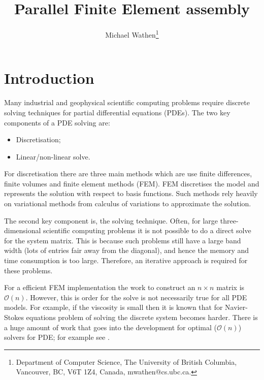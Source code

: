 \documentclass[11pt]{article}
\title{Parallel Finite Element assembly}
\author{
 Michael Wathen\thanks{Department of Computer Science,
The University of British Columbia, Vancouver, BC, V6T 1Z4, Canada,
 mwathen@cs.ubc.ca.}
}
\begin{document}
\maketitle





\section{Introduction}

Many industrial and geophysical scientific computing problems require discrete solving techniques for partial differential equations (PDEs). The two key components of a PDE solving are:
\begin{itemize}
    \item Discretisation;
    \item Linear/non-linear solve.
\end{itemize}
For discretisation there are three main methods which are use finite differences, finite volumes and finite element methods (FEM). FEM discretises the model and represents the solution with respect to basis functions. Such methods rely heavily on variational methods from calculus of variations to approximate the solution.

The second key component is, the solving technique. Often, for large three-dimensional scientific computing problems it is not possible to do a direct solve for the system matrix. This is because such problems still have a large band width (lots of entries fair away from the diagonal), and hence the memory and time consumption is too large. Therefore, an iterative approach is required for these problems.

For a efficient FEM implementation the work to construct an $n\times n$ matrix is $\mathcal{O}(n)$. However, this is order for the solve is not necessarily true for all PDE models. For example, if the viscosity is small then it is known that for Navier-Stokes equations problem of solving the discrete system becomes harder. There is a huge amount of work that goes into the development for optimal ($\mathcal{O}(n)$) solvers for PDE; for example see \cite{bosch2014fast,elman2014finite,greif2007preconditioners}.
\end{document}
